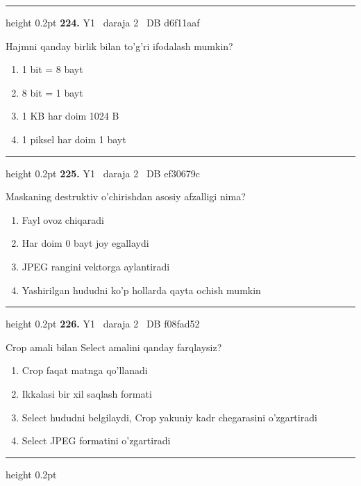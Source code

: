 \documentclass[10pt,a4paper,oneside]{article}
\begin{document}
\vspace{2mm}\hrule height 0.2pt \vspace{4mm}
\hypertarget{q224}{\textbf{\color{ink}224.}}  {\color{muted}\scriptsize Y1 \textbullet\ daraja 2 \textbullet\ DB d6f11aaf}
\par
Hajmni qanday birlik bilan to'g'ri ifodalash mumkin?
\begin{enumerate}[label=\Alph*),leftmargin=9mm]
\item 1 bit = 8 bayt
\item 8 bit = 1 bayt
\item 1 KB har doim 1024 B
\item 1 piksel har doim 1 bayt
\end{enumerate}
\vspace{2mm}\hrule height 0.2pt \vspace{4mm}
\hypertarget{q225}{\textbf{\color{ink}225.}}  {\color{muted}\scriptsize Y1 \textbullet\ daraja 2 \textbullet\ DB ef30679c}
\par
Maskaning destruktiv o'chirishdan asosiy afzalligi nima?
\begin{enumerate}[label=\Alph*),leftmargin=9mm]
\item Fayl ovoz chiqaradi
\item Har doim 0 bayt joy egallaydi
\item JPEG rangini vektorga aylantiradi
\item Yashirilgan hududni ko'p hollarda qayta ochish mumkin
\end{enumerate}
\vspace{2mm}\hrule height 0.2pt \vspace{4mm}
\hypertarget{q226}{\textbf{\color{ink}226.}}  {\color{muted}\scriptsize Y1 \textbullet\ daraja 2 \textbullet\ DB f08fad52}
\par
Crop amali bilan Select amalini qanday farqlaysiz?
\begin{enumerate}[label=\Alph*),leftmargin=9mm]
\item Crop faqat matnga qo'llanadi
\item Ikkalasi bir xil saqlash formati
\item Select hududni belgilaydi, Crop yakuniy kadr chegarasini o'zgartiradi
\item Select JPEG formatini o'zgartiradi
\end{enumerate}
\vspace{2mm}\hrule height 0.2pt \vspace{4mm}
\end{document}

